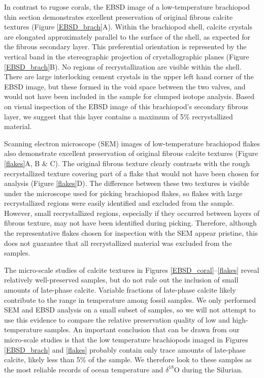 \documentclass[5p, authoryear]{elsarticle}
\begin{document}
In contrast to rugose corals, the EBSD image of a low-temperature brachiopod thin section demonstrates excellent preservation of original fibrous calcite textures (Figure \ref{EBSD_brach}A). Within the brachiopod shell, calcite crystals are elongated approximately parallel to the surface of the shell, as expected for the fibrous secondary layer. This preferential orientation is represented by the vertical band in the stereographic projection of crystallographic planes (Figure \ref{EBSD_brach}B). No regions of recrystallization are visible within the shell. There are large interlocking cement crystals in the upper left hand corner of the EBSD image, but these formed in the void space between the two valves, and would not have been included in the sample for clumped isotope analysis. Based on visual inspection of the EBSD image of this brachiopod's secondary fibrous layer, we suggest that this layer contains a maximum of 5\% recrystallized material. 

Scanning electron microscope (SEM) images of low-temperature brachiopod flakes also demonstrate excellent preservation of original fibrous calcite textures (Figure \ref{flakes}A, B \& C). The original fibrous texture clearly contrasts with the rough recrystallized texture covering part of a flake that would not have been chosen for analysis (Figure \ref{flakes}D). The difference between these two textures is visible under the microscope used for picking brachiopod flakes, so flakes with large recrystallized regions were easily identified and excluded from the sample. However, small recrystallized regions, especially if they occurred between layers of fibrous texture, may not have been identified during picking. Therefore, although the representative flakes chosen for inspection with the SEM appear pristine, this does not guarantee that all recrystallized material was excluded from the samples.

The micro-scale studies of calcite textures in Figures \ref{EBSD_coral}--\ref{flakes} reveal relatively well-preserved samples, but do not rule out the inclusion of small amounts of late-phase calcite. Variable fractions of late-phase calcite likely contribute to the range in temperature among fossil samples. We only performed SEM and EBSD analysis on a small subset of samples, so we will not attempt to use this evidence to compare the relative preservation quality of low and high-temperature samples. An important conclusion that can be drawn from our micro-scale studies is that the low temperature brachiopods imaged in Figures \ref{EBSD_brach} and \ref{flakes} probably contain only trace amounts of late-phase calcite, likely less than 5\% of the sample. We therefore look to these samples as the most reliable records of ocean temperature and $\delta^{18}$O during the Silurian. 
\end{document}
